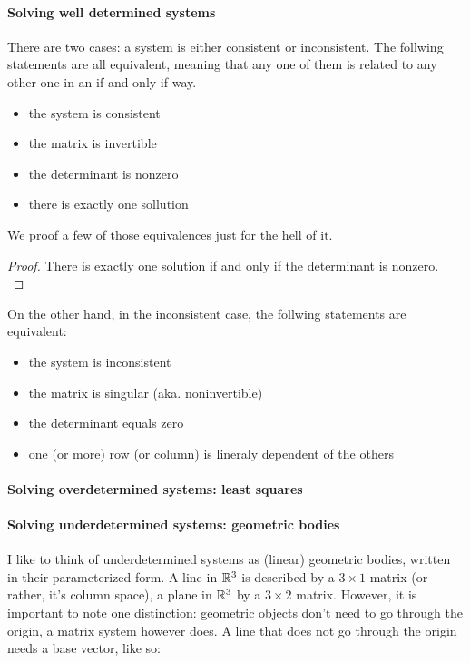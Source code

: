 \paragraph{Solving well determined systems}
There are two cases: a system is either consistent or inconsistent. The follwing statements are all equivalent, meaning that any one of them is related to any other one in an if-and-only-if way. 

\begin{itemize}
    \item the system is consistent
    \item the matrix is invertible
    \item the determinant is nonzero
    \item there is exactly one sollution
\end{itemize}

We proof a few of those equivalences just for the hell of it. 

\begin{proof} There is exactly one solution if and only if the determinant is nonzero. \\
\end{proof}

On the other hand, in the inconsistent case, the follwing statements are equivalent:

\begin{itemize}
    \item the system is inconsistent
    \item the matrix is singular (aka. noninvertible)
    \item the determinant equals zero
    \item one (or more) row (or column) is lineraly dependent of the others
\end{itemize}

\paragraph{Solving overdetermined systems: least squares}


\paragraph{Solving underdetermined systems: geometric bodies}
I like to think of underdetermined systems as (linear) geometric bodies, written in their parameterized form. A line in $\mathbb{R}^3$ is described by a $3 \times 1$ matrix (or rather, it's column space), a plane in $\mathbb{R}^3$ by a $3 \times 2$ matrix. However, it is important to note one distinction: geometric objects don't need to go through the origin, a matrix system however does. A line that does not go through the origin needs a base vector, like so: 

